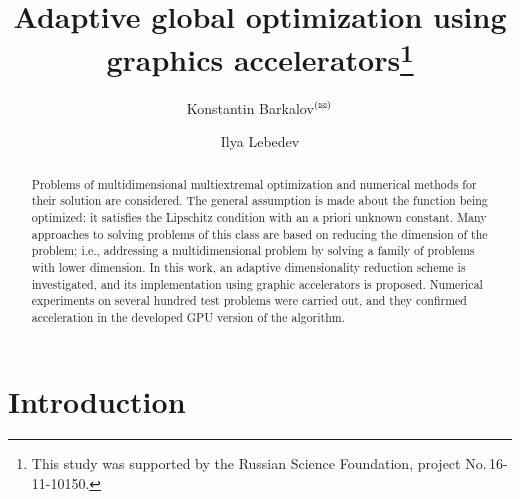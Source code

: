 \documentclass{svproc}
\def\orcidID#1{\unskip$^{[#1]}$}
\def\letter{$^{\textrm{(\Letter)}}$}
\begin{document}
\mainmatter              %
%
\title{Adaptive global optimization using graphics accelerators\thanks{This study was supported by the Russian Science Foundation, project No.\,16-11-10150.}
}
%
%
\author{Konstantin Barkalov\letter%
\and Ilya Lebedev%
}

%
%
%
	

\begin{abstract}

Problems of multidimensional multiextremal optimization and numerical methods for their solution are considered. The general assumption is made about the function being optimized: it satisfies the Lipschitz condition with an a priori unknown constant. Many approaches to solving problems of this class are based on reducing the dimension of the problem; i.e., addressing a multidimensional problem by solving a family of problems with lower dimension. In this work, an adaptive dimensionality reduction scheme is investigated, and its implementation using graphic accelerators is proposed. Numerical experiments on several hundred test problems were carried out, and they confirmed acceleration in the developed GPU version of the algorithm.


\end{abstract}

\section{Introduction}
\end{document}
